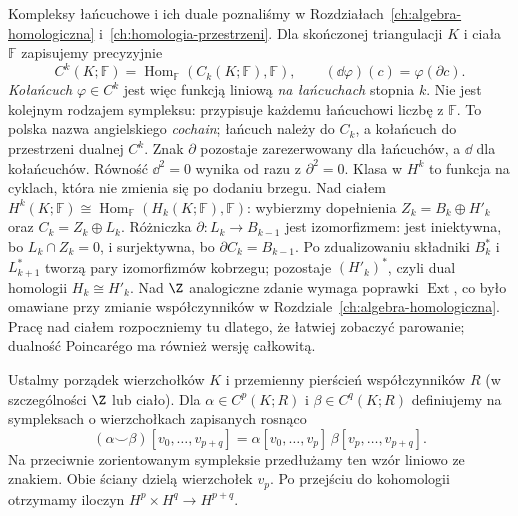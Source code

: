 Kompleksy łańcuchowe i ich duale poznaliśmy
w Rozdziałach~\ref{ch:algebra-homologiczna}
i~\ref{ch:homologia-przestrzeni}. Dla
skończonej triangulacji $K$ i ciała $\mathbb F$
zapisujemy precyzyjnie
\[
 C^k(K;\mathbb F)
   =\operatorname{Hom}_{\mathbb F}
       (C_k(K;\mathbb F),\mathbb F),
 \qquad
 (\dd\varphi)(c)=\varphi(\partial c).
\]
\emph{Kołańcuch} $\varphi\in C^k$ jest więc
funkcją liniową \emph{na łańcuchach} stopnia $k$.
Nie jest kolejnym rodzajem sympleksu:
przypisuje każdemu łańcuchowi liczbę z
$\mathbb F$. To polska nazwa angielskiego
\emph{cochain}; łańcuch należy do $C_k$,
a kołańcuch do przestrzeni dualnej $C^k$.
Znak $\partial$ pozostaje zarezerwowany
dla łańcuchów, a $\dd$ dla kołańcuchów.
Równość $\dd^2=0$ wynika od razu z
$\partial^2=0$. Klasa w $H^k$ to
funkcja na cyklach, która nie zmienia
się po dodaniu brzegu. Nad ciałem
$H^k(K;\mathbb F)\cong
\operatorname{Hom}_{\mathbb F}(H_k(K;\mathbb F),\mathbb F)$:
wybierzmy dopełnienia $Z_k=B_k\oplus H'_k$
oraz $C_k=Z_k\oplus L_k$.
Różniczka $\partial:L_k\to B_{k-1}$ jest izomorfizmem:
jest iniektywna, bo $L_k\cap Z_k=0$, i surjektywna,
bo $\partial C_k=B_{k-1}$.
Po zdualizowaniu składniki $B_k^*$ i $L_{k+1}^*$
tworzą pary izomorfizmów kobrzegu; pozostaje $(H'_k)^*$,
czyli dual homologii $H_k\cong H'_k$.
Nad $\Z$ analogiczne zdanie
wymaga poprawki $\operatorname{Ext}$,
co było omawiane przy zmianie
współczynników w Rozdziale~\ref{ch:algebra-homologiczna}.
Pracę nad ciałem rozpoczniemy tu dlatego,
że łatwiej zobaczyć parowanie;
dualność Poincarégo ma również
wersję całkowitą.

\begin{definicja}
\label{def:kubek-16}
Ustalmy porządek wierzchołków $K$ i przemienny
pierścień współczynników $R$ (w szczególności $\Z$ lub ciało).
Dla $\alpha\in C^p(K;R)$ i $\beta\in C^q(K;R)$ definiujemy
na sympleksach o wierzchołkach zapisanych rosnąco
\[
(\alpha\smile\beta)
 [v_0,\ldots,v_{p+q}]
=\alpha[v_0,\ldots,v_p]\,
 \beta[v_p,\ldots,v_{p+q}].
\]
Na przeciwnie zorientowanym sympleksie przedłużamy ten
wzór liniowo ze znakiem. Obie ściany dzielą wierzchołek $v_p$.
Po przejściu do kohomologii otrzymamy
iloczyn $H^p\times H^q\to H^{p+q}$.
\end{definicja}

